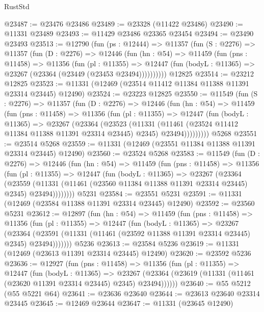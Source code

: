 \begin{lexlean}{RustStd}
\begin{coremodule}
@23487 := @23476 @23486
@23489 := @23328 (@11422 @23486)
@23490 := @11331 @23489
@23493 := @11429 @23486 @23365 @23454
@23494 := @23490 @23493
@23513 := @12790
    (fun (ps : @12444) =>
    @11357
      (fun (S : @2276) =>
      @11357
        (fun (D : @2276) =>
        @12446
          (fun (hn : @54) =>
          @11459
            (fun (pns : @11458) =>
            @11356
              (fun (pl : @11355) =>
              @12447 (fun (bodyL : @11365) => @23267 (@23364 (@23449 (@23453 @23494))))))))))
    @12825
@23514 := @23212 @12825
@23523 := @11331 (@12469 (@23514 @11412 @11384 @11388 @11391 @23314 @23445) @12490)
@23524 := @23223 @12825
@23550 := @11549
    (fun (S : @2276) =>
    @11357
      (fun (D : @2276) =>
      @12446
        (fun (hn : @54) =>
        @11459
          (fun (pns : @11458) =>
          @11356
            (fun (pl : @11355) =>
            @12447
              (fun (bodyL : @11365) =>
              @23267
                (@23364
                  (@23523
                    (@11331
                      (@11461 (@23524 @11412 @11384 @11388 @11391 @23314 @23445) @2345)
                      @23494)))))))))
    @5268
@23551 := @23514 @5268
@23559 := @11331 (@12469 (@23551 @11384 @11388 @11391 @23314 @23445) @12490)
@23560 := @23524 @5268
@23583 := @11549
    (fun (D : @2276) =>
    @12446
      (fun (hn : @54) =>
      @11459
        (fun (pns : @11458) =>
        @11356
          (fun (pl : @11355) =>
          @12447
            (fun (bodyL : @11365) =>
            @23267
              (@23364
                (@23559
                  (@11331 (@11461 (@23560 @11384 @11388 @11391 @23314 @23445) @2345) @23494))))))))
    @5231
@23584 := @23551 @5231
@23591 := @11331 (@12469 (@23584 @11388 @11391 @23314 @23445) @12490)
@23592 := @23560 @5231
@23612 := @12897
    (fun (hn : @54) =>
    @11459
      (fun (pns : @11458) =>
      @11356
        (fun (pl : @11355) =>
        @12447
          (fun (bodyL : @11365) =>
          @23267
            (@23364
              (@23591 (@11331 (@11461 (@23592 @11388 @11391 @23314 @23445) @2345) @23494)))))))
    @5236
@23613 := @23584 @5236
@23619 := @11331 (@12469 (@23613 @11391 @23314 @23445) @12490)
@23620 := @23592 @5236
@23636 := @12927
    (fun (pns : @11458) =>
    @11356
      (fun (pl : @11355) =>
      @12447
        (fun (bodyL : @11365) =>
        @23267 (@23364 (@23619 (@11331 (@11461 (@23620 @11391 @23314 @23445) @2345) @23494))))))
@23640 := @55 @5212 (@55 @5221 @64)
@23641 := @23636 @23640
@23644 := @23613 @23640 @23314 @23445
@23645 := @12469 @23644
@23647 := @11331 (@23645 @12490)

\end{coremodule}
\end{lexlean}
